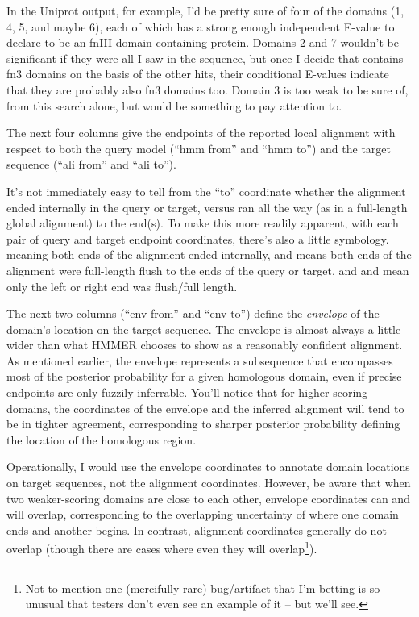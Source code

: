 In the Uniprot output, for example, I'd be pretty sure of four of the
domains (1, 4, 5, and maybe 6), each of which has a strong enough
independent E-value to declare  to be an
fnIII-domain-containing protein. Domains 2 and 7 wouldn't be
significant if they were all I saw in the sequence, but once I decide
that  contains fn3 domains on the basis of the
other hits, their conditional E-values indicate that they are probably
also fn3 domains too. Domain 3 is too weak to be sure of, from this
search alone, but would be something to pay attention to.

The next four columns give the endpoints of the reported local
alignment with respect to both the query model (``hmm from'' and ``hmm
to'') and the target sequence (``ali from'' and ``ali to''). 

It's not immediately easy to tell from the ``to'' coordinate whether
the alignment ended internally in the query or target, versus ran all
the way (as in a full-length global alignment) to the end(s). To make
this more readily apparent, with each pair of query and target
endpoint coordinates, there's also a little symbology. 
meaning both ends of the alignment ended internally, and \prog{[]}
means both ends of the alignment were full-length flush to the ends of
the query or target, and \prog{[.} and \prog{.]} mean only the left or
right end was flush/full length. 

The next two columns (``env from'' and ``env to'') define the
\emph{envelope} of the domain's location on the target sequence.  The
envelope is almost always a little wider than what HMMER chooses to
show as a reasonably confident alignment. As mentioned earlier, the
envelope represents a subsequence that encompasses most of the
posterior probability for a given homologous domain, even if precise
endpoints are only fuzzily inferrable. You'll notice that for higher
scoring domains, the coordinates of the envelope and the inferred
alignment will tend to be in tighter agreement, corresponding to
sharper posterior probability defining the location of the homologous
region. 

Operationally, I would use the envelope coordinates to annotate domain
locations on target sequences, not the alignment coordinates. However,
be aware that when two weaker-scoring domains are close to each other,
envelope coordinates can and will overlap, corresponding to the
overlapping uncertainty of where one domain ends and another begins.
In contrast, alignment coordinates generally do not overlap (though
there are cases where even they will overlap\footnote{Not to mention
  one (mercifully rare) bug/artifact that I'm betting is so unusual
  that testers don't even see an example of it -- but we'll
  see.}).

